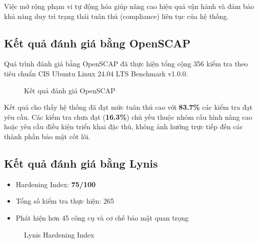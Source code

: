 \noindent Việc mở rộng phạm vi tự động hóa giúp nâng cao hiệu quả vận hành và đảm bảo khả năng duy trì trạng thái tuân thủ (compliance) liên tục của hệ thống.

\subsection{Kết quả đánh giá bằng OpenSCAP}

Quá trình đánh giá bằng OpenSCAP đã thực hiện tổng cộng 356 kiểm tra theo tiêu chuẩn CIS Ubuntu Linux 24.04 LTS Benchmark v1.0.0.

\begin{figure}[H]
\centering
{}
\caption{Kết quả đánh giá OpenSCAP}
\end{figure}



\noindent Kết quả cho thấy hệ thống đã đạt mức tuân thủ cao với \textbf{83.7\%} các kiểm tra đạt yêu cầu. Các kiểm tra chưa đạt (\textbf{16.3\%}) chủ yếu thuộc nhóm cấu hình nâng cao hoặc yêu cầu điều kiện triển khai đặc thù, không ảnh hưởng trực tiếp đến các thành phần bảo mật cốt lõi.

\subsection{Kết quả đánh giá bằng Lynis}

\begin{itemize}
\item Hardening Index: \textbf{75/100}
\item Tổng số kiểm tra thực hiện: 265
\item Phát hiện hơn 45 công cụ và cơ chế bảo mật quan trọng
\end{itemize}

\begin{figure}[H]
\centering
{}
\caption{Lynis Hardening Index}
\end{figure}

